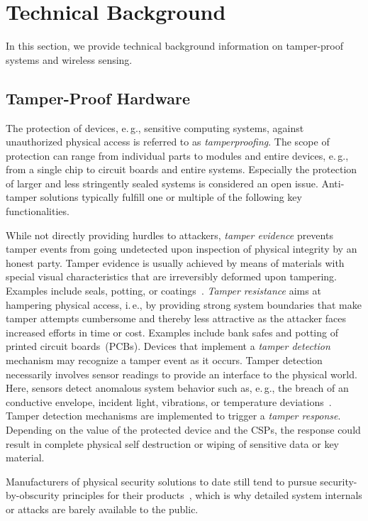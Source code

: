 \documentclass[conference]{IEEEtran}
\makeatletter
\newcommand{\ie}{i.\@\,e.\@\xspace}
\newcommand{\eg}{e.\@\,g.\@\xspace}
\makeatother
\begin{document}
 
\section{Technical Background}

In this section, we provide technical background information on tamper-proof systems and wireless sensing.

\subsection{Tamper-Proof Hardware}
The protection of devices, \eg, sensitive computing systems, against unauthorized physical access is referred to as \textit{tamperproofing}. The scope of protection can range from individual parts to modules and entire devices, \eg, from a single chip to circuit boards and entire systems. Especially the protection of larger and less stringently sealed systems is considered an open issue. Anti-tamper solutions typically fulfill one or multiple of the following key functionalities.

While not directly providing hurdles to attackers, \textit{tamper evidence} prevents tamper events from going undetected upon inspection of physical integrity by an honest party. Tamper evidence is usually achieved by means of materials with special visual characteristics that are irreversibly deformed upon tampering. Examples include seals, potting, or coatings~\cite{appelSecuritySealsVoting2011, andersonSecEngineering}. \textit{Tamper resistance} aims at hampering physical access, \ie, by providing strong system boundaries that make tamper attempts cumbersome and thereby less attractive as the attacker faces increased efforts in time or cost. Examples include bank safes and potting of printed circuit boards~(PCBs). Devices that implement a \textit{tamper detection} mechanism may recognize a tamper event as it occurs. Tamper detection necessarily involves sensor readings to provide an interface to the physical world. Here, sensors detect anomalous system behavior such as, \eg, the breach of an conductive envelope, incident light, vibrations, or temperature deviations~\cite{weingartPhysicalSecurityDevices2000a}. Tamper detection mechanisms are implemented to trigger a \textit{tamper response}. Depending on the value of the protected device and the CSPs, the response could result in complete physical self destruction or wiping of sensitive data or key material.


Manufacturers of physical security solutions to date still tend to pursue security-by-obscurity principles for their products~\cite{helfmeierBreakingEnteringSilicon2013, andersonSecEngineering}, which is why detailed system internals or attacks are barely available to the public.
\end{document}
